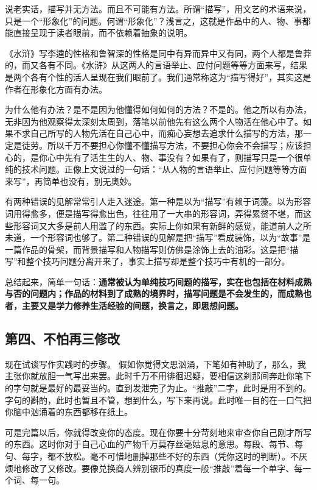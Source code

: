 \documentclass[fontset=fandol,12pt,a5paper]{ctexbook}
\begin{document}
说老实话，描写并无方法。而且不可能有方法。所谓“描写”，用文艺的术语来说，只是一个“形象化”的问题。何谓“形象化”？浅言之，这就是作品中的人、物、事都能直接呈现于读者眼前，而不依赖着抽象的说明。

《水浒》写李逵的性格和鲁智深的性格是同中有异而异中又有同，两个人都是鲁莽的，而又各有不同。《水浒》从这两人的言语举止、应付问题等等方面来写，结果是两个各有个性的活人呈现在我们眼前了。我们通常称这为“描写得好”，其实这是作者在形象化方面有办法。

为什么他有办法？是不是因为他懂得如何如何的方法？不是的。他之所以有办法，无非因为他观察得太深刻太周到，落笔以前他先有这么两个人物活在他心中了。如果不求自己所写的人物先活在自己心中，而痴心妄想去追求什么描写的方法，那一定是徒劳。所以千万不要担心你懂不懂描写方法，不要担心你会不会描写；应该担心的，是你心中先有了活生生的人、物、事没有？如果有了，则描写只是一个很单纯的技术问题。正像上文说过的一句话：“从人物的言语举止、应付问题等等方面来写”，再简单也没有，别无奥妙。

有两种错误的见解常常引人走入迷途。第一种是以为“描写”有赖于词藻。以为形容词用得愈多，便是描写得愈出色，往往用了一大串的形容词，弄得累赘不堪，而这些形容词又大多是前人用滥了的东西。实际上你如果有新鲜的感觉，能道前人之所未道，一个形容词也够了。第二种错误的见解是把“描写”看成装饰，以为“故事”是一篇作品的骨架，而背景描写和人物描写则仿佛是涂饰上去的油彩。这是把“描写”和整个技巧问题分离开来了，事实上描写却是整个技巧中有机的一部分。

总结起来，简单一句话：\textbf{通常被认为单纯技巧间题的描写，实在也包括在材料成熟与否的问题内；作品的材料到了成熟的境界时，描写问题是不会发生的，而成熟也者，主要又是学力修养生活经验的间题，换言之，即思想问题。}

\subsection{第四、不怕再三修改}
现在试谈写作实践时的步骤。
假如你觉得文思汹涌，下笔如有神助了，那么，我主张你就放胆一气写出来罢。此时千万不用徘徊迟疑，要相信这刹那间奔赴你笔下的字句就是最好的最妥当的。直到发泄完了为止。“推敲”二字，此时是用不到的。字句的斟酌，此时也暂且不管，想到什么，写下来再说。此时唯一目的在一口气把你脑中汹涌着的东西都移在纸上。

可是完篇以后，你就得改变你的态度。现在你要十分苛刻地来审查你自己刚才所写的东西。这时你对于自己心血的产物千万莫存丝毫姑息的意思。每段、每节、每句、每字，都不放松。毫不可惜地删掉那些不好的东西（凭你这时的判断）。不厌烦地修改了又修改。要像兑换商人辨别银币的真度一般“推敲”着每一个单字、每一个词、每一句。
\end{document}
